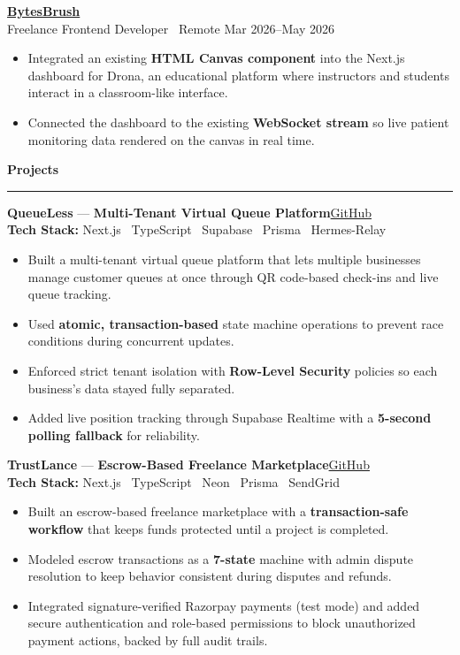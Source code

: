 \documentclass[10pt,a4paper]{article}
\newcommand{\sectionheading}[1]{%
  \par\vspace{3pt}%
  \textbf{\large #1}\\[-8pt]
  \hrule
  \vspace{3pt}%
}
\newcommand{\projectheader}[4]{%
  \noindent\textbf{#1} --- \textbf{#2}\hfill\href{#3}{GitHub}\\[1pt]
  \textbf{Tech Stack:} #4%
}
\begin{document}
\textbf{\href{https://www.bytesbrush.in/}{BytesBrush}}\\
Freelance Frontend Developer \textbar\ Remote
\hfill Mar 2026--May 2026

\begin{itemize}
\item Integrated an existing \textbf{HTML Canvas component} into the Next.js dashboard for Drona, an educational platform where instructors and students interact in a classroom-like interface.
\item Connected the dashboard to the existing \textbf{WebSocket stream} so live patient monitoring data rendered on the canvas in real time.
\end{itemize}


\sectionheading{Projects}

\projectheader
{QueueLess}
{Multi-Tenant Virtual Queue Platform}
{https://github.com/Thushar070/queueless}
{Next.js \textperiodcentered\ TypeScript \textperiodcentered\ Supabase \textperiodcentered\ Prisma \textperiodcentered\ Hermes-Relay}

\begin{itemize}
\item Built a multi-tenant virtual queue platform that lets multiple businesses manage customer queues at once through QR code-based check-ins and live queue tracking.
\item Used \textbf{atomic, transaction-based} state machine operations to prevent race conditions during concurrent updates.
\item Enforced strict tenant isolation with \textbf{Row-Level Security} policies so each business's data stayed fully separated.
\item Added live position tracking through Supabase Realtime with a \textbf{5-second polling fallback} for reliability.
\end{itemize}

\vspace{4pt}

\projectheader
{TrustLance}
{Escrow-Based Freelance Marketplace}
{https://github.com/Thushar070/trustlance}
{Next.js \textperiodcentered\ TypeScript \textperiodcentered\ Neon \textperiodcentered\ Prisma \textperiodcentered\ SendGrid}

\begin{itemize}
\item Built an escrow-based freelance marketplace with a \textbf{transaction-safe workflow} that keeps funds protected until a project is completed.
\item Modeled escrow transactions as a \textbf{7-state} machine with admin dispute resolution to keep behavior consistent during disputes and refunds.
\item Integrated signature-verified Razorpay payments (test mode) and added secure authentication and role-based permissions to block unauthorized payment actions, backed by full audit trails.
\end{itemize}
\end{document}
